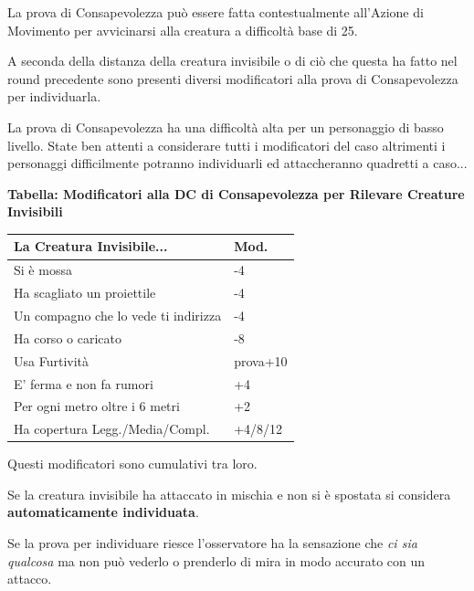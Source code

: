 \begin{multicols}{2}
La prova di Consapevolezza può essere fatta contestualmente all'Azione di Movimento per avvicinarsi alla creatura a difficoltà base di 25.

A seconda della distanza della creatura invisibile o di ciò che questa ha fatto nel round precedente sono presenti diversi modificatori alla prova di Consapevolezza per individuarla.

\medskip

\begin{narratore}[Invisibilità]
La prova di Consapevolezza ha una difficoltà alta per un personaggio di basso livello. State ben attenti a considerare tutti i modificatori del caso altrimenti i personaggi difficilmente potranno individuarli ed attaccheranno quadretti a caso...
\end{narratore}

\bigskip

\textbf{Tabella: Modificatori alla DC di Consapevolezza per Rilevare Creature Invisibili}

\medskip

\noindent\begin{tabularx}{\linewidth}{Xl}
	\toprule
\rowcolor{gray!20}\textbf{La Creatura Invisibile...} & \textbf{Mod.}\\
\toprule
Si è mossa& -4\\
\rowcolor{gray!20}Ha scagliato un proiettile & -4\\
Un compagno che lo vede ti indirizza & -4\\
\rowcolor{gray!20}Ha corso o caricato& -8\\
Usa Furtività & prova+10\\
\rowcolor{gray!20}E' ferma e non fa rumori & +4\\
Per ogni metro oltre i 6 metri & +2\\
\rowcolor{gray!20}Ha copertura Legg./Media/Compl. & +4/8/12
\end{tabularx}

\medskip

Questi modificatori sono cumulativi tra loro.

Se la creatura invisibile ha attaccato in mischia e non si è spostata si considera \textbf{automaticamente individuata}.

Se la prova per individuare riesce l'osservatore ha la sensazione che \emph{ci sia qualcosa} ma non può vederlo o prenderlo di mira in modo accurato con un attacco.


\end{multicols}
